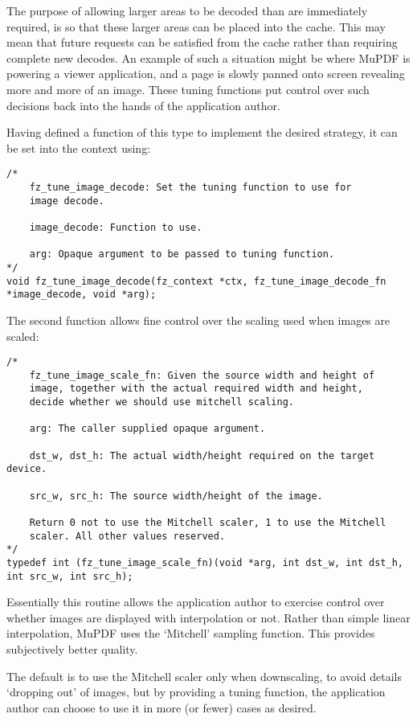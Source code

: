 \documentclass[oneside]{book}
\begin{document}
The purpose of allowing larger areas to be decoded than are immediately required, is so that these larger areas can be placed into the cache. This may mean that future requests can be satisfied from the cache rather than requiring complete new decodes. An example of such a situation might be where MuPDF is powering a viewer application, and a page is slowly panned onto screen revealing more and more of an image. These tuning functions put control over such decisions back into the hands of the application author.

Having defined a function of this type to implement the desired strategy, it can be set into the context using:

\begin{lstlisting}
/*
	fz_tune_image_decode: Set the tuning function to use for
	image decode.

	image_decode: Function to use.

	arg: Opaque argument to be passed to tuning function.
*/
void fz_tune_image_decode(fz_context *ctx, fz_tune_image_decode_fn *image_decode, void *arg);
\end{lstlisting}

The second function allows fine control over the scaling used when images are scaled:

\begin{lstlisting}
/*
	fz_tune_image_scale_fn: Given the source width and height of
	image, together with the actual required width and height,
	decide whether we should use mitchell scaling.

	arg: The caller supplied opaque argument.

	dst_w, dst_h: The actual width/height required on the target device.

	src_w, src_h: The source width/height of the image.

	Return 0 not to use the Mitchell scaler, 1 to use the Mitchell
	scaler. All other values reserved.
*/
typedef int (fz_tune_image_scale_fn)(void *arg, int dst_w, int dst_h, int src_w, int src_h);
\end{lstlisting}

Essentially this routine allows the application author to exercise control over whether images are displayed with interpolation or not. Rather than simple linear interpolation, MuPDF uses the `Mitchell' sampling function. This provides subjectively better quality.

The default is to use the Mitchell scaler only when downscaling, to avoid details `dropping out' of images, but by providing a tuning function, the application author can choose to use it in more (or fewer) cases as desired.
\end{document}
